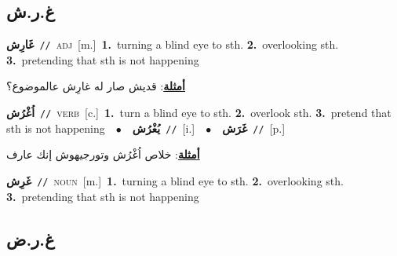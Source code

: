 \documentclass[10pt,a4paper,twoside]{article} %
\begin{document}
\begin{multicols}{2}
{{{{{{{{{{{{{{{{\vspace{-3mm}
\subsection*{\color{blue}\foreignlanguage{arabic}{غ.ر.ش}\color{blue}{}} 

{\setlength\topsep{0pt}\textbf{\foreignlanguage{arabic}{غَارِش}}\ {\color{gray}\texttt{//}\color{black}}\ \textsc{adj}\ [m.]\ \textbf{1.}~turning a blind eye to sth.  \textbf{2.}~overlooking sth.  \textbf{3.}~pretending that sth is not happening\  \begin{flushright}\color{gray}\foreignlanguage{arabic}{\textbf{\underline{\foreignlanguage{arabic}{أمثلة}}}: قديش صار له غارِش عالموضوع؟}\end{flushright}\color{black}} \vspace{2mm}

{\setlength\topsep{0pt}\textbf{\foreignlanguage{arabic}{اُغْرُش}}\ {\color{gray}\texttt{//}\color{black}}\ \textsc{verb}\ [c.]\ \textbf{1.}~turn a blind eye to sth.  \textbf{2.}~overlook sth.  \textbf{3.}~pretend that sth is not happening\ \ $\bullet$\ \ \setlength\topsep{0pt}\textbf{\foreignlanguage{arabic}{يُغْرُش}}\ {\color{gray}\texttt{//}\color{black}}\ [i.]\ \ $\bullet$\ \ \setlength\topsep{0pt}\textbf{\foreignlanguage{arabic}{غَرَش}}\ {\color{gray}\texttt{//}\color{black}}\ [p.]\  \begin{flushright}\color{gray}\foreignlanguage{arabic}{\textbf{\underline{\foreignlanguage{arabic}{أمثلة}}}: خلاص اُغْرُش وتورجيهوش إنك عارف}\end{flushright}\color{black}} \vspace{2mm}

{\setlength\topsep{0pt}\textbf{\foreignlanguage{arabic}{غَرِش}}\ {\color{gray}\texttt{//}\color{black}}\ \textsc{noun}\ [m.]\ \textbf{1.}~turning a blind eye to sth.  \textbf{2.}~overlooking sth.  \textbf{3.}~pretending that sth is not happening\ 

\vspace{-3mm}
\subsection*{\color{blue}\foreignlanguage{arabic}{غ.ر.ض}\color{blue}{}} 

}}}}}}}}}}}}}}}}}
\end{multicols}
\end{document}
